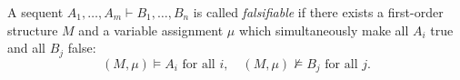 

\setcounter{section}{2}
\setcounter{subsection}{2}
\setcounter{dfn}{4}

\begin{dfn}
A sequent $A_1, \ldots, A_m \vdash B_1, \ldots, B_n$ is called \emph{falsifiable}
if there exists a first-order structure $M$ and a variable assignment $\mu$ which simultaneously make all $A_i$ true and all $B_j$ false:
\[
(M,\mu) \vDash A_i \text{ for all }i, \quad (M,\mu) \not\vDash B_j \text{ for all }j.
\]
\end{dfn}

